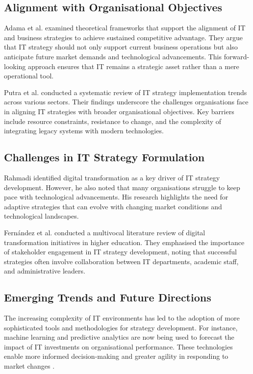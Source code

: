 \documentclass[sigconf]{acmart}
\begin{document}
\subsection{Alignment with Organisational Objectives}

Adama et al. \cite{adama2024alignment} examined theoretical frameworks that support the alignment of IT and business strategies to achieve sustained competitive advantage. They argue that IT strategy should not only support current business operations but also anticipate future market demands and technological advancements. This forward-looking approach ensures that IT remains a strategic asset rather than a mere operational tool.

Putra et al. \cite{putra2022trends} conducted a systematic review of IT strategy implementation trends across various sectors. Their findings underscore the challenges organisations face in aligning IT strategies with broader organisational objectives. Key barriers include resource constraints, resistance to change, and the complexity of integrating legacy systems with modern technologies.


\subsection{Challenges in IT Strategy Formulation}

Rahmadi \cite{rahmadi2024research} identified digital transformation as a key driver of IT strategy development. However, he also noted that many organisations struggle to keep pace with technological advancements. His research highlights the need for adaptive strategies that can evolve with changing market conditions and technological landscapes.

Fernández et al. \cite{fernandez2023digital} conducted a multivocal literature review of digital transformation initiatives in higher education. They emphasised the importance of stakeholder engagement in IT strategy development, noting that successful strategies often involve collaboration between IT departments, academic staff, and administrative leaders.

\subsection{Emerging Trends and Future Directions}

The increasing complexity of IT environments has led to the adoption of more sophisticated tools and methodologies for strategy development. For instance, machine learning and predictive analytics are now being used to forecast the impact of IT investments on organisational performance. These technologies enable more informed decision-making and greater agility in responding to market changes \cite{digitalsystems2022strategy}.
\end{document}
